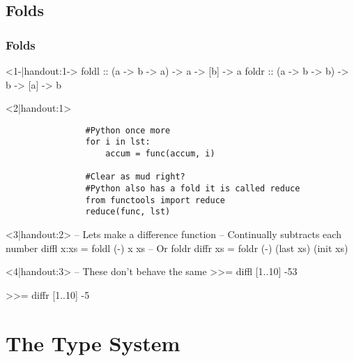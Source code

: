 \subsection{Folds}
\begin{frame}[t,fragile]
    \frametitle{Folds}
    \begin{overprint}
        \begin{hscode}<1-|handout:1->
            foldl :: (a -> b -> a) -> a -> [b] -> a
            foldr :: (a -> b -> b) -> b -> [a] -> b
        \end{hscode}

        \begin{onlyenv}<2|handout:1>
            \begin{verbatim}
                #Python once more
                for i in lst:
                    accum = func(accum, i)

                #Clear as mud right?
                #Python also has a fold it is called reduce
                from functools import reduce
                reduce(func, lst)
            \end{verbatim}
        \end{onlyenv}

        \begin{hscode}<3|handout:2>
            -- Lets make a difference function
            -- Continually subtracts each number
            diffl x:xs = foldl (-) x xs
            -- Or foldr
            diffr xs = foldr (-) (last xs) (init xs)
        \end{hscode}
        \begin{hscode}<4|handout:3>
            -- These don't behave the same
            >>= diffl [1..10]
            -53

            >>= diffr [1..10]
            -5
        \end{hscode}
    \end{overprint}
\end{frame}

\section{The Type System}
